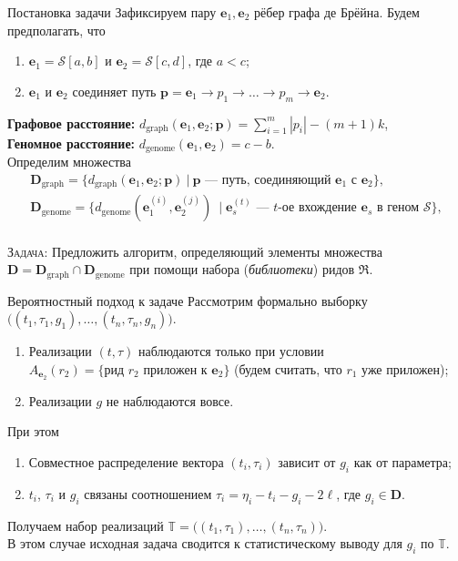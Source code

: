 \documentclass[unicode, notheorems]{beamer}
\begin{document}
\begin{frame}{Постановка задачи}
Зафиксируем пару $\mathbf{e}_1, \mathbf{e}_2$ рёбер графа де Брёйна.
Будем предполагать, что
\begin{enumerate}
	\item  $\mathbf{e}_1 = \mathcal{S}[a, b]$ и $\mathbf{e}_2 = \mathcal{S}[c, d]$, где $a < c$;
	\item $\mathbf{e}_1$ и $\mathbf{e}_2$ соединяет путь $\bm p =  \mathbf{e}_1 \to p_1 \to \ldots \to p_m \to \mathbf{e}_2$.
\end{enumerate}
\bigskip
{\bf Графовое расстояние:} $d_{\mathrm{graph}} (\mathbf{e}_1, \mathbf{e}_2; \bm p) = \sum_{i=1}^m |p_i| - (m+1)k$,\\
\medskip
{\bf Геномное расстояние:} $d_{\mathrm{genome}}(\mathbf{e}_1, \mathbf{e}_2) = c - b$.\\
\bigskip
Определим множества
\begin{gather*}
\mathbf{D}_{\mathrm{graph}} = \big\{ d_{\mathrm{graph}} (\mathbf{e}_1, \mathbf{e}_2; \bm p)\  |\  \bm p \text{ --- путь, соединяющий } \mathbf{e}_1 \text{ с } \mathbf{e}_2  \big\} , \\
\mathbf{D}_{\mathrm{genome}} = \big\{  d_{\mathrm{genome}}(\mathbf{e}_1^{(i)}, \mathbf{e}_2^{(j)})\ \mid \mathbf{e}_s^{(t)} \text{ --- } t \text{-ое вхождение } \mathbf{e}_s \text{ в геном } \mathcal{S} \big\},
\end{gather*}\\ 
\textsc{ \large \color{blue} Задача:}
Предложить алгоритм, определяющий  элементы множества $\mathbf{D} = \mathbf{D}_{\mathrm{graph}} \cap \mathbf{D}_{\mathrm{genome}}$ при помощи набора (\textit{библиотеки}) ридов $\mathfrak{R}$.
\end{frame}

\begin{frame}{Вероятностный подход к задаче}
	Рассмотрим формально выборку $\Big( (t_1, \tau_1, g_1), \ldots, (t_n, \tau_n, g_n) \Big)$.
	\begin{enumerate}
		\item Реализации $(t, \tau)$ наблюдаются только при условии $A_{\mathbf{e}_2}(r_2) = \{\text{рид } r_2 \text{ приложен к } \mathbf{e}_2\}$ (будем считать, что $r_1$ уже приложен);
		\item Реализации $g$ не наблюдаются вовсе.
	\end{enumerate}
	\smallskip
	При этом
	\begin{enumerate}
		\item Совместное распределение вектора $(t_i, \tau_i)$ зависит от $g_i$ как от параметра;
		\item $t_i$, $\tau_i$ и $g_i$ связаны соотношением $\tau_i = \eta_i - t_i - g_i - 2\ell$, где $g_i  \in \mathbf{D}$.
	\end{enumerate}
	\smallskip
	Получаем набор реализаций $\mathbb{T} = \Big( (t_1, \tau_1), \ldots, (t_n, \tau_n) \Big)$.\\
	\medskip
	{\color{blue} В этом случае исходная задача сводится к статистическому выводу для $g_i$ по $\mathbb{T}$.}
\end{frame}
\end{document}
